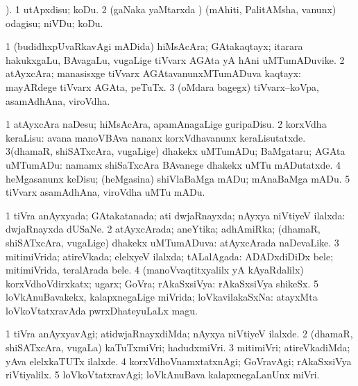 \bentry
{}
\gl{\sakirx}
). \bmng
\bnum
\num{1} utApxdisu; koDu. 
\num{2} (gaNaka yaMtarxda \vi) (mAhiti, PalitAMsha, \mo vanunx) odagisu; niVDu; koDu. 
\enum
\emng
\eentry

\bentry
{}
\gl{\nA}
\bmng
\bnum
\num{1} (budidhxpUvaRkavAgi mADida) hiMsAcAra; GAtakaqtayx; itarara hakukxgaLu, BAvagaLu, \mo vugaLige tiVvarx AGAta yA hAni uMTumADuvike. 
\num{2} atAyxcAra; manasisxge tiVvarx AGAtavanunxMTumADuva kaqtayx:  mayARdege tiVvarx AGAta, peTuTx. 
\num{3} (oMdara bagegx) tiVvarx--koVpa, asamAdhAna, viroVdha. 
\enum
\emng
\eentry
 
\bentry
{}
\gl{\sakirx}
\bmng
\bnum
\num{1} atAyxcAra naDesu; hiMsAcAra, apamAnagaLige guripaDisu. 
\num{2} korxVdha keraLisu:  avana manoVBAva nananx korxVdhavanunx keraLisutatxde. 
\num{3}(dhamaR, shiSATxcAra, \mo vugaLige) dhakekx uMTumADu; BaMgataru; AGAta uMTumADu:  namamx shiSaTxcAra BAvanege dhakekx uMTu mADutatxde. 
\num{4} heMgasanunx keDisu; (heMgasina) shiVlaBaMga mADu; mAnaBaMga mADu. 
\num{5} tiVvarx asamAdhAna, viroVdha uMTu mADu. 
\enum
\emng
\eentry

\bentry
{}
\gl{\gu}
\bmng
\bnum
\num{1} tiVra anAyxyada; GAtakatanada; ati dwjaRnayxda; nAyxya niVtiyeV ilalxda:  dwjaRnayxda dUSaNe. 
\num{2} atAyxcArada; aneYtika; adhAmiRka; (dhamaR, shiSATxcAra, \mo vugaLige) dhakekx uMTumADuva:  atAyxcArada naDevaLike. 
\num{3} mitimiVrida; atireVkada; elelxyeV ilalxda; tALalAgada:  ADADxdiDiDx bele; mitimiVrida, teralArada bele. 
\num{4} (manoVvaqtitxyalilx yA kAyaRdalilx) korxVdhoVdirxkatx; ugarx; GoVra; rAkaSxsiVya:  rAkaSxsiVya shikeSx. 
\num{5} loVkAnuBavakekx, kalapxnegaLige miVrida; loVkavilakaSxNa:  atayxMta loVkoVtatxravAda pwrxDhateyuLaLx magu. 
\enum
\emng
\eentry

\bentry
{}
\gl{\kirxvi}
\bmng
\bnum
\num{1} tiVra anAyxyavAgi; atidwjaRnayxdiMda; nAyxya niVtiyeV ilalxde. 
\num{2} (dhamaR, shiSATxcAra, \mo vugaLa) kaTuTxmiVri; hadudxmiVri. 
\num{3} mitimiVri; atireVkadiMda; yAva elelxkaTUTx ilalxde. 
\num{4} korxVdhoVnamxtatxnAgi; GoVravAgi; rAkaSxsiVya riVtiyalilx. 
\num{5} loVkoVtatxravAgi; loVkAnuBava kalapxnegaLanUnx miVri. 
\enum
\emng
\eentry

